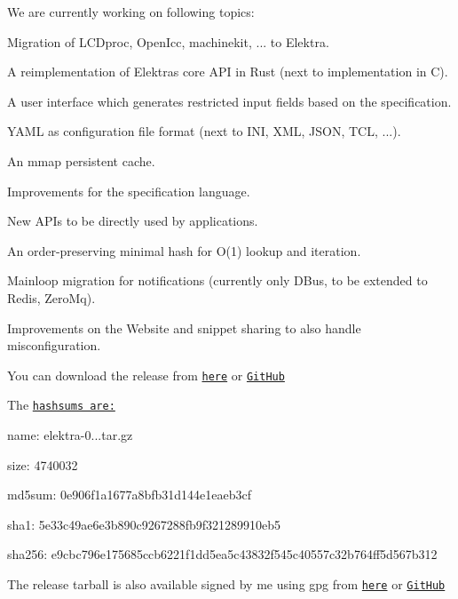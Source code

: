 We are currently working on following topics\+:


\begin{DoxyItemize}
\item Migration of L\+C\+Dproc, Open\+Icc, machinekit, ... to Elektra.
\item A reimplementation of Elektra\textquotesingle{}s core A\+PI in Rust (next to implementation in C).
\item A user interface which generates restricted input fields based on the specification.
\item Y\+A\+ML as configuration file format (next to I\+NI, X\+ML, J\+S\+ON, T\+CL, ...).
\item An mmap persistent cache.
\item Improvements for the specification language.
\item New A\+P\+Is to be directly used by applications.
\item An order-\/preserving minimal hash for O(1) lookup and iteration.
\item Mainloop migration for notifications (currently only D\+Bus, to be extended to Redis, Zero\+Mq).
\item Improvements on the Website and snippet sharing to also handle misconfiguration.
\end{DoxyItemize}

You can download the release from \href{https://www.libelektra.org/ftp/elektra/releases/elektra-0.8.20.tar.gz}{\tt here} or \href{https://github.com/ElektraInitiative/ftp/blob/master/releases/elektra-0.8.20.tar.gz?raw=true}{\tt Git\+Hub}

The \href{https://github.com/ElektraInitiative/ftp/blob/master/releases/elektra-0.8.20.tar.gz.hashsum?raw=true}{\tt hashsums are\+:}


\begin{DoxyItemize}
\item name\+: elektra-\/0...\+tar.\+gz
\item size\+: 4740032
\item md5sum\+: 0e906f1a1677a8bfb31d144e1eaeb3cf
\item sha1\+: 5e33c49ae6e3b890c9267288fb9f321289910eb5
\item sha256\+: e9cbc796e175685ccb6221f1dd5ea5c43832f545c40557c32b764ff5d567b312
\end{DoxyItemize}

The release tarball is also available signed by me using gpg from \href{https://www.libelektra.org/ftp/elektra/releases/elektra-0.8.20.tar.gz.gpg}{\tt here} or \href{https://github.com/ElektraInitiative/ftp/blob/master/releases//elektra-0.8.20.tar.gz.gpg?raw=true}{\tt Git\+Hub}

